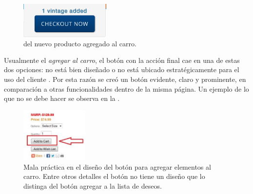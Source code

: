 		\begin{figure}[H]
			\centering
			\includegraphics[width=0.4\textwidth]{figuras/cart/ui/add_notification.png}
			\caption{\FeedbackCPT del nuevo producto agregado al carro.}
			\label{figure:solution:cart:add_motification}
		\end{figure}

		Usualmente el \textit{agregar al carro}, el botón con la acción final \websiteINT \ecommerceCOM cae en una de estas dos opciones: no está bien diseñado o no está ubicado estratégicamente para el uso del cliente \cite{online_official_usabilitygeek_guidelines_usability}. Por esta razón se creó un botón evidente, claro y prominente, en comparación a otras funcionalidades dentro de la misma página. Un ejemplo de lo que no se debe hacer se observa en la .

		\begin{figure}[H]
			\centering
			\includegraphics[width=0.3\textwidth]{figuras/productos/examples/usabilitygeek_guidelines_wrong_ui_add_to_cart.png}
			\caption{Mala práctica en el diseño del botón para agregar elementos al carro. Entre otros detalles el botón no tiene un diseño que lo distinga del botón agregar a la lista de deseos.}
			\label{figure:apendice:productos:example:usabilitygeek_guidelines_wrong_ui_add_to_cart}
		\end{figure}

